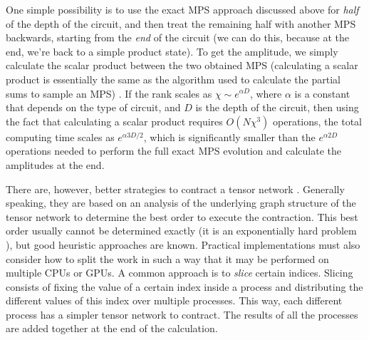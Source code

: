 \documentclass{SciPost}
\begin{document}
One simple possibility is to use the exact MPS approach discussed above for \emph{half} of the depth of the circuit, and then treat the remaining half with another MPS backwards, starting from the \emph{end} of the circuit (we can do this, because at the end, we're back to a simple product state). To get the amplitude, we simply calculate the scalar product between the two obtained MPS (calculating a scalar product is essentially the same as the algorithm used to calculate the partial sums to sample an MPS) \cite{ayral2023}. If the rank scales as $\chi \sim e^{\alpha D}$, where
$\alpha$ is a constant that depends on the type of circuit, and $D$ is the depth of the circuit, then using the fact that calculating a scalar product requires $O(N \chi^3)$ operations, the total computing time scales as $e^{\alpha 3D/2}$, which is significantly smaller than the $e^{\alpha 2D}$ operations needed to perform the full exact MPS evolution and calculate the amplitudes at the end.

There are, however, better strategies to contract a tensor network \cite{pan2019}. Generally speaking, they are based on an analysis of the underlying graph structure of the tensor network to determine the best order to execute the contraction. This best order usually cannot be determined exactly (it is an exponentially hard problem \cite{pfeifer2014}), but good heuristic approaches are known. Practical implementations must also consider how to split the work in such a way that it may be performed on multiple
CPUs or GPUs. A common approach is to \emph{slice} certain indices. Slicing consists of fixing the value of a certain index inside a process and distributing the different values of this index over multiple processes.
This way, each different process has a simpler tensor network to contract. The results of all the processes are added together at the end of the calculation.
\end{document}
